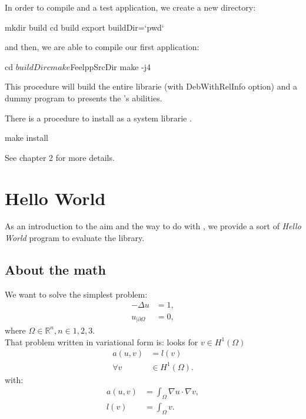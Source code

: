 In order to compile \feel and a test application, we create a new directory:
\begin{unixcom}
  mkdir build
  cd build
  export buildDir=`pwd`
\end{unixcom}

and then, we are able to compile our first application:
\begin{unixcom}
  cd $buildDir
  cmake $FeelppSrcDir
  make -j4
\end{unixcom}

This procedure will build the entire librarie (with DebWithRelInfo option) and a dummy program to presents the \feel's abilities.

There is a procedure to install as a system librarie \feel.
\begin{unixcom}
  make install
\end{unixcom}
See chapter 2 for more details.

\section{\feel Hello World}
\label{sec:feel-hello-world}

As an introduction to the aim and the way to do with \feel, we provide a sort of
\textit{Hello World} program to evaluate the library.

\subsection{About the math}
\label{sec:about-math}

We want to solve the simplest problem:
\begin{equation}\nonumber
  \begin{aligned}
    - \Delta u &= 1,\\
    u_{|\partial \Omega} &= 0,
  \end{aligned}
\end{equation}
where $\Omega \in \mathbb{R}^n, n\in{1,2,3}$.\\

That problem written in variational form is:
looks for $v\in H^1\left( \Omega \right)$
\begin{equation}\nonumber
  \begin{aligned}
    a\left( u,v \right)&=l\left( v \right)\\
\forall v &\in H^1\left( \Omega \right).
  \end{aligned}
\end{equation}
with:
\begin{equation}\nonumber
  \begin{aligned}
    a\left( u,v \right)&=\int_{\Omega} \nabla u \cdot \nabla v ,\\
    l\left( v \right) &= \int_{\Omega} v .
  \end{aligned}
\end{equation}


